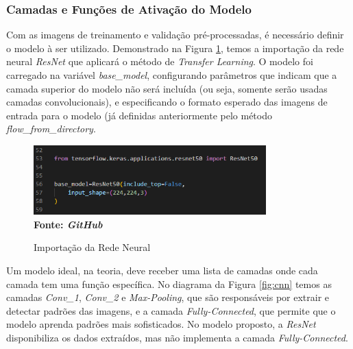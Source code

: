 \subsubsection{\esp Camadas e Funções de Ativação do Modelo} \label{camadas}
Com as imagens de treinamento e validação pré-processadas, é necessário definir o modelo à ser utilizado. Demonstrado na Figura \ref{fig:resnet}, temos a importação da rede neural \textit{ResNet} que aplicará o método de \textit{Transfer Learning}. O modelo foi carregado na variável \textit{base\_model}, configurando parâmetros que indicam que a camada superior do modelo não será incluída (ou seja, somente serão usadas camadas convolucionais), e especificando o formato esperado das imagens de entrada para o modelo (já definidas anteriormente pelo método \textit{flow\_from\_directory}.

 \begin{figure}[ht]
 	\centering	
 	\caption[\hspace{0.1cm}Grade Computacional.]{Importação da Rede Neural}
 	\vspace{-0.4cm}
 	\includegraphics[width=0.8\textwidth]{figuras/resnet50.png}
 	\captionsetup{justification=centering}
	\vspace{-0.2cm}
     \\\textbf{\footnotesize Fonte: \textit{GitHub}}
	\label{fig:resnet}
\end{figure}


Um modelo ideal, na teoria, deve receber uma lista de camadas onde cada camada tem uma função específica. No diagrama da Figura \ref{fig:cnn} temos as camadas \textit{Conv\_1}, \textit{Conv\_2} e \textit{Max-Pooling}, que são responsáveis por extrair e detectar padrões das imagens, e a camada \textit{Fully-Connected}, que permite que o modelo aprenda padrões mais sofisticados. No modelo proposto, a \textit{ResNet} disponibiliza os dados extraídos, mas não implementa a camada \textit{Fully-Connected}.

